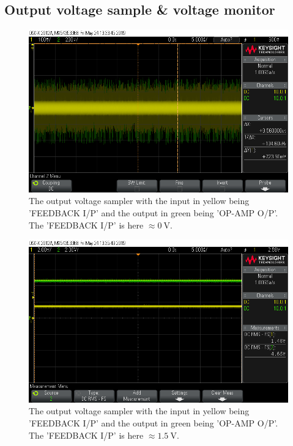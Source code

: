 \subsection{Output voltage sample \& voltage monitor}


\begin{figure}[H]
\centering
\includegraphics[width=.9\textwidth]{figures/scope_7.png}
\caption{The output voltage sampler with the input in yellow being 'FEEDBACK I/P' and the output in green being 'OP-AMP O/P'. The 'FEEDBACK I/P' is here $\approx \SI{0}{\volt}$.}
\label{fig:scope_7}
\end{figure}


\begin{figure}[H]
\centering
\includegraphics[width=.9\textwidth]{figures/scope_8.png}
\caption{The output voltage sampler with the input in yellow being 'FEEDBACK I/P' and the output in green being 'OP-AMP O/P'. The 'FEEDBACK I/P' is here $\approx \SI{1.5}{\volt}$.}
\label{fig:scope_8}
\end{figure}


